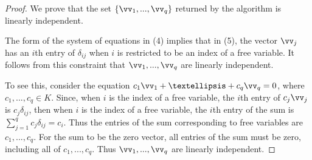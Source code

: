 \begin{proof}
    We prove that the set $\{\vv_1, ..., \vv_q\}$ returned by the algorithm is linearly independent.

    The form of the system of equations in (4) implies that in (5), the vector $\vv_j$ has an $i$th entry of $\delta_{ij}$ when $i$ is restricted to be an index of a free variable. It follows from this constraint that $\vv_1, ..., \vv_q$ are linearly independent. 
    
    To see this, consider the equation $c_1 \vv_1 + … + c_q \vv_q = 0$, where $c_1, ..., c_q \in K$. Since, when $i$ is the index of a free variable, the $i$th entry of $c_j \vv_j$ is $c_j \delta_{ij}$, then when $i$ is the index of a free variable, the $i$th entry of the sum is $\sum_{j = 1}^q c_j \delta_{ij} = c_i$. Thus the entries of the sum corresponding to free variables are $c_1, ..., c_q$. For the sum to be the zero vector, all entries of the sum must be zero, including all of $c_1, ..., c_q$. Thus $\vv_1, ..., \vv_q$ are linearly independent.
\end{proof}

